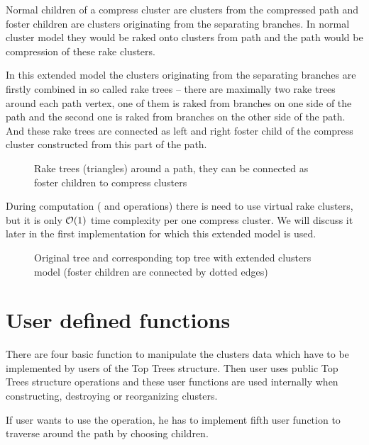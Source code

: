 Normal children of a compress cluster are clusters from the compressed path and
foster children are clusters originating from the separating branches. In normal
cluster model they would be raked onto clusters from path and the path would be
compression of these rake clusters.

In this extended model the clusters originating from the separating branches are
firstly combined in so called {\I rake trees} -- there are maximally two rake
trees around each path vertex, one of them is raked from branches on one side of
the path and the second one is raked from branches on the other side of the
path. And these rake trees are connected as left and right foster child of the
compress cluster constructed from this part of the path.

\begin{figure}[H]
\centering
{}
\caption{Rake trees (triangles) around a path, they can be connected as
foster children to compress clusters}
\end{figure}

During computation (\Join{} and \Split{} operations) there is need to use
virtual rake clusters, but it is only ${\cal O}(1)$ time complexity per one compress
cluster. We will discuss it later in the first implementation for which this
extended model is used.

\begin{figure}[h]
\centering
{}
\caption{Original tree and corresponding top tree with extended clusters model
(foster children are connected by dotted edges)}
\end{figure}



\section{User defined functions}

There are four basic function to manipulate the clusters data which have to
be implemented by users of the Top Trees structure. Then user uses public Top
Trees structure operations and these user functions are used internally when
constructing, destroying or reorganizing clusters.

If user wants to use the \Search{} operation, he has to implement fifth user
function \Choose{} to traverse around the path by choosing children.


